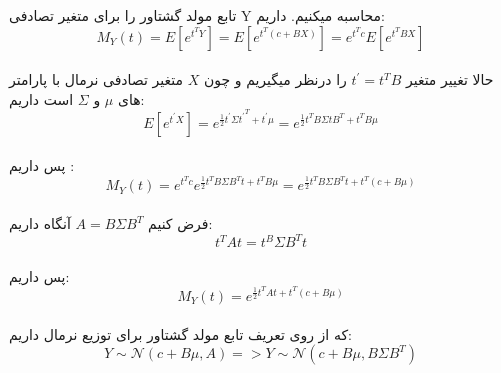 تابع مولد گشتاور را برای متغیر تصادفی Y
محاسبه میکنیم. داریم:\\
\[
    M_Y(t) = E[e^{t^{T} Y}]
    = E[e^{t^{T} (c+BX)}]
    = e^{t^{T}c}E[e^{t^{T}BX}]
\]\\
حالا تغییر متغیر $t^\prime = t^{T}B$
را درنظر میگیریم و چون $X$ متغیر تصادفی نرمال با
پارامتر های $\mu$ و $\Sigma$ است
داریم:\\
\[
    E[e^{t^\prime X}]
    = e^{\frac{1}{2}{t^\prime}\Sigma{t^\prime}^{T}+{t^\prime}\mu}
    = e^{\frac{1}{2}{t^{T}B}\Sigma{t{B}^{T}}+{t^{T}B}\mu}
\]\\
پس داریم :\\
\[
    M_Y(t) = e^{t^{T}c}e^{\frac{1}{2}{t^{T}B}\Sigma{{B}^{T}t}+{t^{T}B}\mu}
    = e^{\frac{1}{2}{t^{T}B}\Sigma{{B}^{T}t}+t^{T}(c+B\mu)}
\]\\
فرض کنیم $A = B\Sigma B^{T}$ آنگاه داریم:\\
\[
    t^{T}At = t^ B\Sigma B^{T}t 
\]\\
پس داریم:\\
\[
    M_Y(t) = e^{\frac{1}{2}{t^{T}At}+t^{T}(c+B\mu)}
\]\\
که از روی تعریف تابع مولد گشتاور برای توزیع نرمال داریم:\\
\[
    Y \sim \mathcal{N}(c+B\mu, A) 
    => Y \sim \mathcal{N}(c+B\mu, B\varSigma B^T)
\]